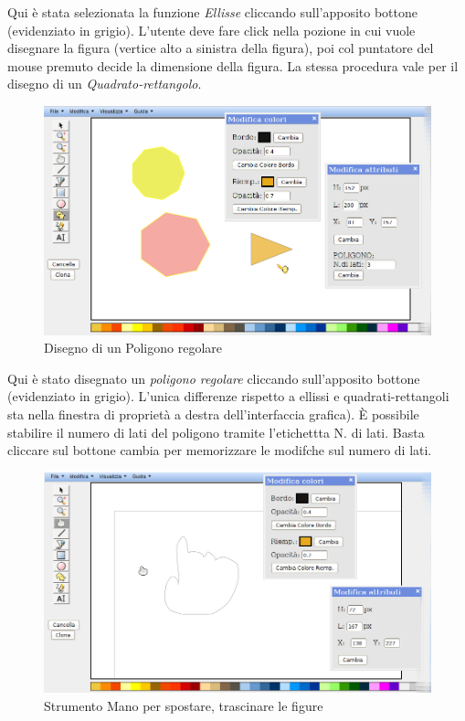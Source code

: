 \vspace{100pt}
Qui \`e stata selezionata la funzione \textit{Ellisse}  cliccando sull'apposito bottone (evidenziato in grigio). L'utente deve fare click nella pozione in cui vuole disegnare la figura (vertice alto a sinistra della figura), poi col puntatore del mouse premuto decide la dimensione della figura. La stessa procedura vale per il disegno di un \textit{Quadrato-rettangolo}.

\begin{figure}[!ht]
\centering
\includegraphics[scale=4]{images/poligono.png}
\caption{Disegno di un Poligono regolare}
\end{figure} 

\vspace{300pt}
Qui \`e stato disegnato un \textit{poligono regolare}  cliccando sull'apposito bottone (evidenziato in grigio). L'unica differenze rispetto a ellissi e quadrati-rettangoli sta nella finestra di propriet\`a a destra dell'interfaccia grafica). \`E possibile stabilire il numero di lati del poligono tramite l'etichettta N. di lati. Basta cliccare sul bottone cambia per memorizzare le modifche sul numero di lati.

\begin{figure}[!ht]
\centering
\includegraphics[scale=4]{images/mano.png}
\caption{Strumento Mano per spostare, trascinare le figure}
\end{figure} 

